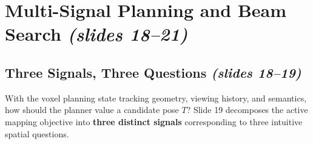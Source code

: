 \documentclass[11pt,a4paper]{article}
\theoremstyle{definition}
\theoremstyle{plain}
\theoremstyle{remark}
\begin{document}
\section{Multi-Signal Planning and Beam Search \emph{(slides 18--21)}}

\subsection{Three Signals, Three Questions \emph{(slides 18--19)}}

With the voxel planning state tracking geometry, viewing history, and semantics, how should the planner value a candidate pose $T$? Slide 19 decomposes the active mapping objective into \textbf{three distinct signals} corresponding to three intuitive spatial questions.
\end{document}
